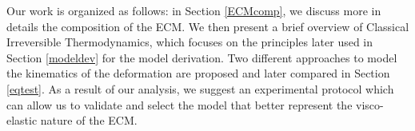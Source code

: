 Our work is organized as follows: in Section \ref{ECMcomp}, we discuss more in details the composition of the ECM. We then present a brief overview of Classical Irreversible Thermodynamics, which focuses on the principles later used in Section \ref{modeldev} for the model derivation. Two different approaches to model the kinematics of the deformation are proposed and later compared in Section \ref{eqtest}. As a result of our analysis, we suggest an experimental protocol which can allow us to validate and select the model that better represent the visco-elastic nature of the ECM. 